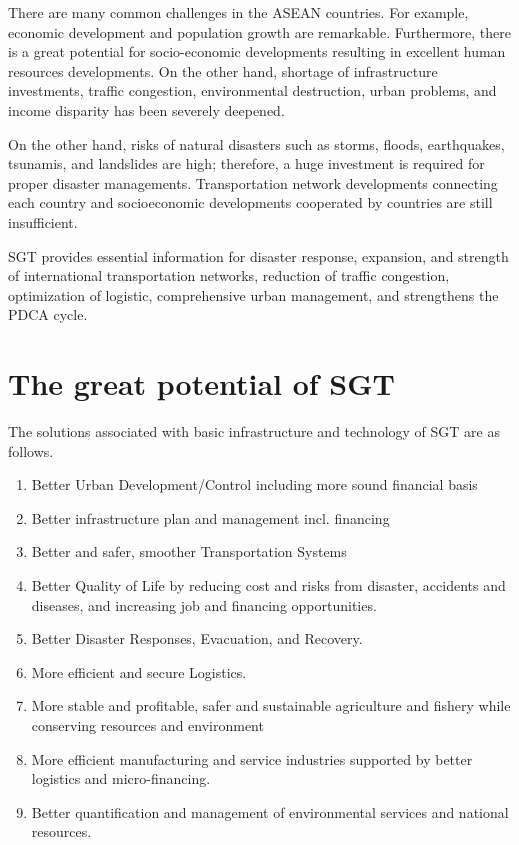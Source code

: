 \vspace{0.4 cm}

There are many common challenges in the ASEAN countries. For example, economic development and population growth are remarkable. Furthermore, there is a great potential for socio-economic developments resulting in excellent human resources developments. On the other hand, shortage of infrastructure investments, traffic congestion, environmental destruction, urban problems, and income disparity has been severely deepened.

\vspace{0.4 cm}

On the other hand, risks of natural disasters such as storms, floods, earthquakes, tsunamis, and landslides are high; therefore, a huge investment is required for proper disaster managements. Transportation network developments connecting each country and socioeconomic developments cooperated by countries are still insufficient.

\vspace{0.4 cm}

SGT provides essential information for disaster response, expansion, and strength of international transportation networks, reduction of traffic congestion, optimization of logistic, comprehensive urban management, and strengthens the PDCA cycle.




\section{The great potential of SGT}

The solutions associated with basic infrastructure and technology of SGT are as follows.

\begin{enumerate}

\item Better Urban Development/Control including more sound financial basis
\item Better infrastructure plan and management incl. financing \item Better and safer, smoother Transportation Systems
\item Better Quality of Life by reducing cost and risks from disaster, accidents and diseases, and increasing job and financing opportunities.
\item Better Disaster Responses, Evacuation, and Recovery.
\item More efficient and secure Logistics.
\item More stable and profitable, safer and sustainable agriculture and fishery while conserving resources and environment
\item More efficient manufacturing and service industries supported by better logistics and micro-financing.
\item Better quantification and management of environmental services and national resources.

\end{enumerate}

